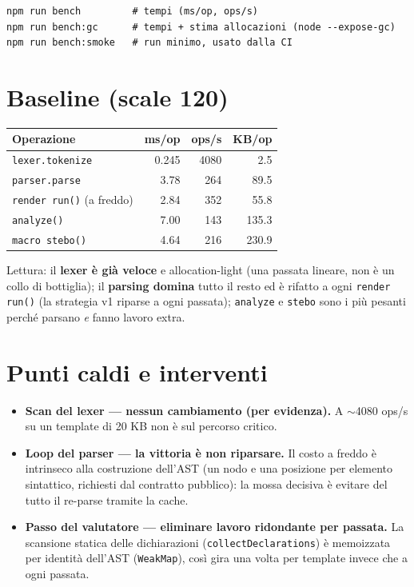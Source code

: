 \documentclass[11pt,a4paper]{book}
\let\code\lstinline
\theoremstyle{definition}
\begin{document}
{{{{\begin{lstlisting}
npm run bench         # tempi (ms/op, ops/s)
npm run bench:gc      # tempi + stima allocazioni (node --expose-gc)
npm run bench:smoke   # run minimo, usato dalla CI
\end{lstlisting}

\section{Baseline (scale 120)}

\begin{center}
\small
\begin{tabular}{@{}l r r r@{}}
\toprule
\textbf{Operazione} & \textbf{ms/op} & \textbf{ops/s} & \textbf{KB/op} \\
\midrule
\code|lexer.tokenize| & 0.245 & 4080 & 2.5 \\
\code|parser.parse| & 3.78 & 264 & 89.5 \\
\code|render run()| (a freddo) & 2.84 & 352 & 55.8 \\
\code|analyze()| & 7.00 & 143 & 135.3 \\
\code|macro stebo()| & 4.64 & 216 & 230.9 \\
\bottomrule
\end{tabular}
\end{center}

Lettura: il \textbf{lexer è già veloce} e allocation-light (una passata lineare, non
è un collo di bottiglia); il \textbf{parsing domina} tutto il resto ed è rifatto a
ogni \code|render run()| (la strategia v1 riparse a ogni passata); \code|analyze| e
\code|stebo| sono i più pesanti perché parsano \emph{e} fanno lavoro extra.

\section{Punti caldi e interventi}

\begin{itemize}
  \item \textbf{Scan del lexer --- nessun cambiamento (per evidenza).} A $\sim$4080
    ops/s su un template di 20 KB non è sul percorso critico.
  \item \textbf{Loop del parser --- la vittoria è non riparsare.} Il costo a freddo è
    intrinseco alla costruzione dell'AST (un nodo e una posizione per elemento
    sintattico, richiesti dal contratto pubblico): la mossa decisiva è evitare del
    tutto il re-parse tramite la cache.
  \item \textbf{Passo del valutatore --- eliminare lavoro ridondante per passata.} La
    scansione statica delle dichiarazioni (\code|collectDeclarations|) è memoizzata
    per identità dell'AST (\code|WeakMap|), così gira una volta per template invece
    che a ogni passata.
\end{itemize}

}}}}
\end{document}
